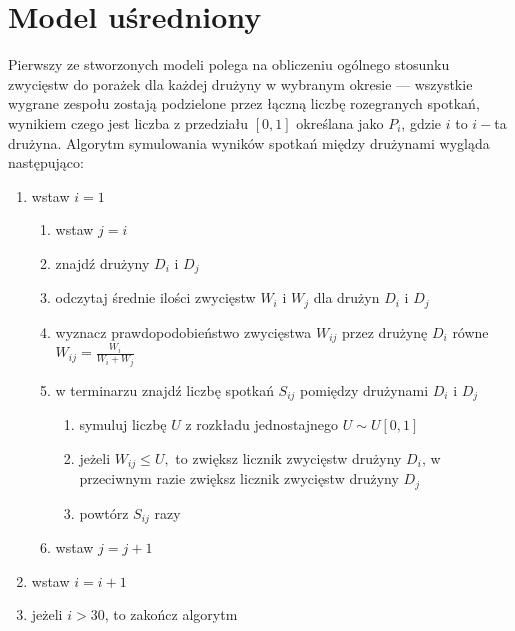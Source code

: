 \documentclass[inzynierska]{pwr_wmat_praca_dyplomowa}
\theoremstyle{plain}
\numberwithin{theorem}{chapter}
\theoremstyle{definition}
\numberwithin{theorem}{chapter}
\begin{document}
\section{Model uśredniony}
Pierwszy ze stworzonych modeli polega na obliczeniu ogólnego stosunku zwycięstw do porażek dla każdej drużyny w wybranym okresie --- wszystkie wygrane zespołu zostają podzielone przez łączną liczbę rozegranych spotkań, wynikiem czego jest liczba z przedziału $[0,1]$ określana jako $P_{i}$, gdzie $i$ to $i-$ta drużyna. Algorytm symulowania wyników spotkań między drużynami wygląda następująco:
\begin{enumerate}
	\item wstaw $i=1$
	\begin{enumerate}
		\item wstaw $j=i$
		\item znajdź drużyny $D_i$ i $D_j$
		\item odczytaj średnie ilości zwycięstw $W_i$ i $W_j$ dla drużyn $D_i$ i $D_j$ 
		\item wyznacz prawdopodobieństwo zwycięstwa $W_{ij}$ przez drużynę  $D_i$ równe $W_{ij}=\frac{W_i}{W_i + W_j}$   
		\item w terminarzu znajdź liczbę spotkań $S_{ij}$ pomiędzy drużynami $D_i$ i $D_j$
			\begin{enumerate}
				\item symuluj liczbę $U$ z rozkładu jednostajnego $U\sim U[0,1]$ 
			\item jeżeli $W_{ij} \leq U,$ to zwiększ licznik zwycięstw drużyny $D_i$, w przeciwnym razie zwiększ licznik zwycięstw drużyny $D_j$
			\item powtórz $S_{ij}$ razy
			\end{enumerate}
		\item wstaw $j=j+1$
	\end{enumerate}
	\item wstaw $i=i+1$
	\item jeżeli $i> 30$, to zakończ algorytm
\end{enumerate} 
\end{document}
